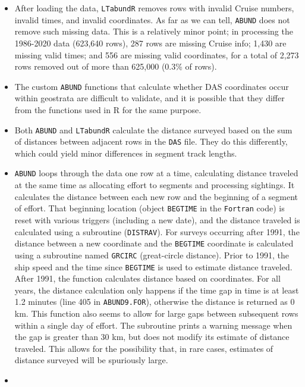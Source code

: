 \documentclass[
]{book}
\begin{document}
\begin{itemize}
\item
  After loading the data, \texttt{LTabundR} removes rows with invalid Cruise numbers, invalid times, and invalid coordinates. As far as we can tell, \texttt{ABUND} does not remove such missing data. This is a relatively minor point; in processing the 1986-2020 data (623,640 rows), 287 rows are missing Cruise info; 1,430 are missing valid times; and 556 are missing valid coordinates, for a total of 2,273 rows removed out of more than 625,000 (0.3\% of rows).
\item
  The custom \texttt{ABUND} functions that calculate whether DAS coordinates occur within geostrata are difficult to validate, and it is possible that they differ from the functions used in R for the same purpose.
\item
  Both \texttt{ABUND} and \texttt{LTabundR} calculate the distance surveyed based on the sum of distances between adjacent rows in the \texttt{DAS} file. They do this differently, which could yield minor differences in segment track lengths.
\item
  \texttt{ABUND} loops through the data one row at a time, calculating distance traveled at the same time as allocating effort to segments and processing sightings. It calculates the distance between each new row and the beginning of a segment of effort. That beginning location (object \texttt{BEGTIME} in the \texttt{Fortran} code) is reset with various triggers (including a new date), and the distance traveled is calculated using a subroutine (\texttt{DISTRAV}). For surveys occurring after 1991, the distance between a new coordinate and the \texttt{BEGTIME} coordinate is calculated using a subroutine named \texttt{GRCIRC} (great-circle distance). Prior to 1991, the ship speed and the time since \texttt{BEGTIME} is used to estimate distance traveled. After 1991, the function calculates distance based on coordinates. For all years, the distance calculation only happens if the time gap in time is at least 1.2 minutes (line 405 in \texttt{ABUND9.FOR}), otherwise the distance is returned as 0 km. This function also seems to allow for large gaps between subsequent rows within a single day of effort. The subroutine prints a warning message when the gap is greater than 30 km, but does not modify its estimate of distance traveled. This allows for the possibility that, in rare cases, estimates of distance surveyed will be spuriously large.
\item

\end{itemize}
\end{document}
